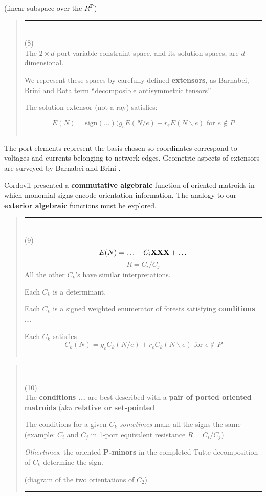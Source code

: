 \documentclass{article}
\begin{document}
(linear subspace over the $R^{\mathbf{P}}$)

\pagebreak[3] \begin{quote}\rule{\textwidth}{3pt}\\
(8)\\
The $2\times d$ port variable constraint space, 
and its solution spaces, are $d$-dimensional.

We represent these spaces by carefully defined
\textbf{extensors}, as Barnabei, Brini and Rota \cite{exteriorCalc}
term ``decomposible antisymmetric tensors''

The solution extensor (not a ray) satisfies:

\[
E(N) = \text{sign}(...)(g_e E(N/e) + r_e E(N\backslash e)
\text{\ for\ }e\not\in P
\]

\rule{\textwidth}{3pt}
\end{quote}

The port elements represent the basis chosen so coordinates correspond
to voltages and currents belonging to network edges.  Geometric aspects
of extensors are surveyed by 
Barnabei and Brini \cite{exteriorCalc}.

Cordovil\cite{CommAlgOMs} 
presented a \textbf{commutative algebraic} function of 
oriented matroids in which monomial signs encode orientation information.
The analogy to our \textbf{exterior algebraic} functions must be explored. 

\pagebreak[3] \begin{quote}\rule{\textwidth}{3pt}\\
(9)\\
\[
E(N) = \ldots + C_i\mbox{\bf XXX} + \ldots
\]
\[
R = C_i/C_j
\]
All the other $C_k$'s have similar interpretations.

Each $C_k$ is a determinant.

Each $C_k$ is a signed weighted enumerator of
forests satisfying \textbf{conditions ...}

Each $C_k$ satisfies
\[
C_k(N) = g_e C_k(N/e) + r_e C_k(N\backslash e)
\text{\ for\ }e\not\in {P}
\]

\rule{\textwidth}{3pt}
\end{quote}


\pagebreak[3] \begin{quote}\rule{\textwidth}{3pt}\\
(10)\\
The \textbf{conditions ...} are best described with 
a \textbf{pair of ported oriented matroids}
(aka \textbf{relative or set-pointed}

The conditions for a given $C_k$ \textit{sometimes}
make all the signs the same (example: $C_i$ and 
$C_j$ in 1-port equivalent resistance $R=C_i/C_j$)

\textit{Othertimes}, the oriented \textbf{P-minors}
in the completed Tutte decomposition of $C_k$ determine
the sign.

(diagram of the two orientations of $C_2$)

\rule{\textwidth}{3pt}
\end{quote}
\end{document}
